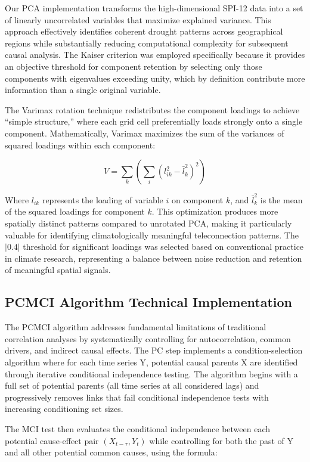 \documentclass[
]{krantz}
\begin{document}
Our PCA implementation transforms the high-dimensional SPI-12 data into a set of linearly uncorrelated variables that maximize explained variance. This approach effectively identifies coherent drought patterns across geographical regions while substantially reducing computational complexity for subsequent causal analysis. The Kaiser criterion was employed specifically because it provides an objective threshold for component retention by selecting only those components with eigenvalues exceeding unity, which by definition contribute more information than a single original variable.

The Varimax rotation technique redistributes the component loadings to achieve ``simple structure,'' where each grid cell preferentially loads strongly onto a single component. Mathematically, Varimax maximizes the sum of the variances of squared loadings within each component:

\[V = \sum_k(\sum_i(l^2_{ik} - \bar{l}^2_k)^2)\]

Where \(l_{ik}\) represents the loading of variable \(i\) on component \(k\), and \(\bar{l}^2_k\) is the mean of the squared loadings for component \(k\). This optimization produces more spatially distinct patterns compared to unrotated PCA, making it particularly valuable for identifying climatologically meaningful teleconnection patterns. The \(|0.4|\) threshold for significant loadings was selected based on conventional practice in climate research, representing a balance between noise reduction and retention of meaningful spatial signals.

\subsection{PCMCI Algorithm Technical Implementation}\label{pcmci-algorithm-technical-implementation}

The PCMCI algorithm addresses fundamental limitations of traditional correlation analyses by systematically controlling for autocorrelation, common drivers, and indirect causal effects. The PC step implements a condition-selection algorithm where for each time series Y, potential causal parents X are identified through iterative conditional independence testing. The algorithm begins with a full set of potential parents (all time series at all considered lags) and progressively removes links that fail conditional independence tests with increasing conditioning set sizes.

The MCI test then evaluates the conditional independence between each potential cause-effect pair \((X_{t-\tau}, Y_t)\) while controlling for both the past of Y and all other potential common causes, using the formula:
\end{document}
